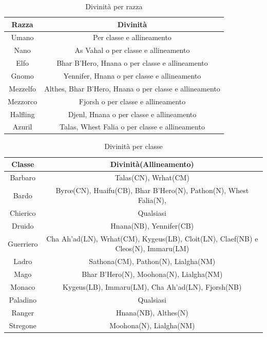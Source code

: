 \documentclass[10pt, a4paper]{report}
\begin{document}
\vspace{1cm}
\begin{table}[h]
\centering
{\sffamily
\begin{tabular}{||c|c||}
\hline
\bfseries	Razza & \bfseries Divinità\\
\hline
Umano & Per classe e allineamento\\
\hline
Nano & As Vahal o per classe e allineamento\\
\hline
Elfo & \quad \quad \quad \quad \quad \quad Bhar B'Hero, Hnana o per classe e allineamento \quad \quad \quad \quad \quad \quad\\
\hline
Gnomo & Yennifer, Hnana o per classe e allineamento\\
\hline
Mezzelfo & Althes, Bhar B'Hero, Hnana o per classe e allineamento\\
\hline 
Mezzorco & Fjorsh o per classe e allineamento\\
\hline
Halfling & Djenl, Hnana o per classe e allineamento\\
\hline
Azuril & Talas, Whest Falia o per classe e allineamento\\
\hline
\end{tabular}
}
\caption{Divinità per razza}
\end{table}

\begin{table}[h]
\centering
{\sffamily
\begin{tabular}{||c|c||}
\hline
\bfseries Classe & \bfseries Divinità(Allineamento)\\
\hline
Barbaro & Talas(CN), Wrhat(CM)\\
\hline
Bardo & \quad Byrœ(CN), Huaifu(CB), Bhar B'Hero(N), Pathon(N), Whest Falia(N), \quad \\
\hline
Chierico & Qualsiasi\\
\hline
Druido & Hnana(NB), Yennifer(CB)\\
\hline
Guerriero & Cha Ah'ad(LN), Wrhat(CM), Kygeus(LB), Cloit(LN), Claef(NB) e Cleos(N), Immaru(LM)\\
\hline
Ladro & Sathona(CM), Pathon(N), Lialgha(NM)\\
\hline
Mago & Bhar B'Hero(N), Moohona(N), Lialgha(NM)\\
\hline
Monaco & Kygeus(LB), Immaru(LM), Cha Ah'ad(LN), Fjorsh(NB)\\
\hline
Paladino & Qualsiasi\\
\hline
Ranger & Hnana(NB), Althes(N)\\
\hline
Stregone & Moohona(N), Lialgha(NM)\\
\hline
\end{tabular}
}
\caption{Divinità per classe}
\end{table}
\end{document}
